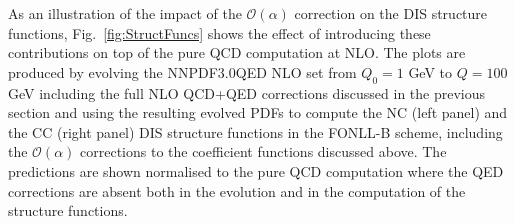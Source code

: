 As an illustration of the impact of the $\mathcal{O}(\alpha)$
correction on the DIS structure functions, Fig.~\ref{fig:StructFuncs}
shows the effect of introducing these contributions on top of the pure
QCD computation at NLO. The plots are produced by evolving the
NNPDF3.0QED NLO set from $Q_0=1$ GeV to $Q=100$ GeV including the full
NLO QCD+QED corrections discussed in the previous section and using
the resulting evolved PDFs to compute the NC (left panel) and the CC
(right panel) DIS structure functions in the FONLL-B scheme, including
the $\mathcal{O}(\alpha)$ corrections to the coefficient functions
discussed above. The predictions are shown normalised to the pure QCD
computation where the QED corrections are absent both in the evolution
and in the computation of the structure functions.

